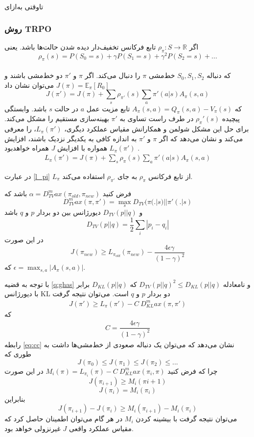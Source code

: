 ‌تاوقتی
‌به‌ازای
\subsubsection{روش TRPO}
اگر
$\rho_\pi : S \longrightarrow \mathbb{R}$
تابع فرکانس تخفیف‌دار دیده شدن حالت‌ها باشد. یعنی $$\rho_\pi(s) = P(S_0=s) + \gamma P(S_1=s) + \gamma^2 P(S_2=s) + ...$$ \\که دنباله $S_0, S_1, S_2$ خط‌مشی $\pi$ را دنبال می‌کند.
اگر $\pi$ و $\pi'$ دو خط‌مشی باشند و  $J(\pi) = \mathbb{E}_\pi[R_0]$  می‌توان نشان داد 
$$J(\pi')= J(\pi) + \sum_{s} \rho_{\pi'}(s) \sum_{a} \pi'(a|s) A_\pi(s,a)$$ که  $A_\pi(s,a) = Q_\pi (s,a) - V_\pi(s)$ تابع مزیت عمل $a$ در حالت $s$ باشد.
وابستگی پیچیده  $\rho_\pi'(s)$ در طرف راست تساوی به $\pi'$ بهینه‌سازی مستقیم را مشکل می‌کند.
برای حل این مشکل شولمن و همکارانش 
مقیاس عملکرد دیگری، $L_\pi(\pi')$، را معرفی می‌کند و نشان می‌دهد که اگر $\pi$ و $\pi'$ به اندازه کافی به یکدیگر نزدیک باشند، افزایش  $L_\pi(\pi')$  همواره با افزایش $J$ همراه خواهد‌بود \cite{schulman2015trust}.
\begin{align}
L_\pi(\pi')= J(\pi) + \sum_{s} \rho_{\pi}(s) \sum_{a} \pi'(a|s) A_\pi(s,a)
\label{l_pi}
\end{align}


در عبارت 
\ref{l_pi}
 $L_\pi$ از تابع فرکانس $\rho_\pi$ به جای $
\rho_{\pi'}$
 استفاده می‌کند.
 
فرض کنید 
$\alpha = D_{TV}^max(\pi_{old}, \pi_{new})$
باشد که 
$$D_{TV}^max (\pi, \pi') = \max_{s} D_{TV}(\pi(.|s) || \pi'(.|s)$$
و 
$D_{TV}(p || q)$
دیورژانس 
 بین دو بردار $p$ و $q$ باشد
$$D_{TV}(p || q) = \dfrac{1}{2} \sum_{i} |p_i - q_i|$$ در این صورت
$$J(\pi_{new}) \ge L_{\pi_{old}}(\pi_{new}) - \dfrac{4 \epsilon \gamma}{(1- \gamma)^2}$$ که $\epsilon = \max_{s,a} |A_\pi(s,a)|$.
\label{q:ghas}

با توجه به قضیه \ref{q:ghas} و نامعادله $D_{TV}(p || q)^2 \le D_{KL}(p || q)$  که  $D_{KL} (p || q)$ برابر با دیورژانس KL دو بردار $p$ و $q$ است\cite{schulman2015trust}. می‌توان  نتیجه گرفت
\begin{align*}
J(\pi') \ge L_{\pi}(\pi') - C \ D_{KL}^max(\pi, \pi')
\end{align*}
که
\begin{align}
C = \dfrac{4 \epsilon \gamma}{(1-\gamma)^2}
\label{eq:cc}
\end{align}
رابطه \ref{eq:cc} نشان می‌دهد که می‌توان یک دنباله صعودی از خط‌مشی‌ها داشت به طوری که
$$J(\pi_0) \le J(\pi_1) \le J(\pi_2) \le ... $$
چرا که فرض کنید
$M_i(\pi) = L_{\pi_i}(\pi) - C \ D_{KL}^max(\pi_i, \pi)$
در این صورت $$J(\pi_{i+1}) \ge M_i(\pi{i+1}) $$ 
$$J(\pi_i) = M_i(\pi_i)$$
بنابراین
$$J(\pi_{i+1}) - J(\pi_i) \ge M_i(\pi_{i+1}) - M_i(\pi_i)$$
می‌توان نتیجه گرفت با بیشینه کردن $M_i$ در هر گام می‌توان اطمینان حاصل کرد که مقیاس عملکرد واقعی $J$ غیرنزولی خواهد بود.

